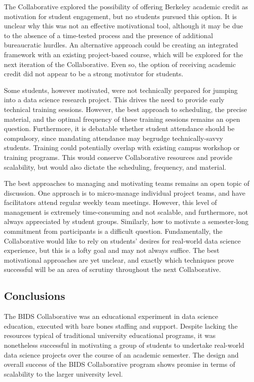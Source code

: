\documentclass[12pt]{article}
\begin{document}
The Collaborative explored the possibility of offering Berkeley academic credit as motivation for student engagement, but no students pursued this option. It is unclear why this was not an effective motivational tool, although it may be due to the absence of a time-tested process and the presence of additional bureaucratic hurdles. An alternative approach could be creating an integrated framework with an existing project-based course, which will be explored for the next iteration of the Collaborative.  Even so, the option of receiving academic credit did not appear to be a strong motivator for students.

Some students, however motivated, were not technically prepared for jumping into a data science research project.  This drives the need to provide early technical training sessions.  However, the best approach to scheduling, the precise material, and the optimal frequency of these training sessions remains an open question.  Furthermore, it is debatable whether student attendance should be compulsory, since mandating attendance may begrudge technically-savvy students.  Training could potentially overlap with existing campus workshop or training programs.  This would conserve Collaborative resources and provide scalability, but would also dictate the scheduling, frequency, and material.

The best approaches to managing and motivating teams remains an open topic of discussion.  One approach is to micro-manage individual project teams, and have facilitators attend regular weekly team meetings.  However, this level of management is extremely time-consuming and not scalable, and furthermore, not always appreciated by student groups.  Similarly, how to motivate a semester-long commitment from participants is a difficult question.  Fundamentally, the Collaborative would like to rely on students' desires for real-world data science experience, but this is a lofty goal and may not always suffice.  The best motivational approaches are yet unclear, and exactly which techniques prove successful will be an area of scrutiny throughout the next Collaborative.

\subsection{Conclusions}

The BIDS Collaborative was an educational experiment in data science education, executed with bare bones staffing and support. Despite lacking the resources typical of traditional university educational programs, it was nonetheless successful in motivating a group of students to undertake real-world data science projects over the course of an academic semester.  The design and overall success of the BIDS Collaborative program shows promise in terms of scalability to the larger university level.
\end{document}
